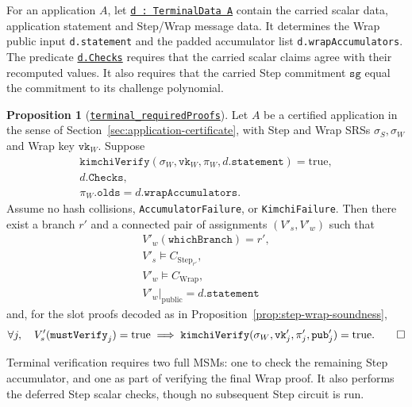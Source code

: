 \documentclass[11pt,a4paper]{article}
\newcommand{\inlinecode}[1]{\mbox{\texttt{#1}}}
\newcommand{\restrict}[2]{\left.#1\right\rvert_{#2}}
\theoremstyle{definition}
\theoremstyle{insetstatement}
\newtheorem{propositiontext}[example]{Proposition}
\newenvironment{statementblock}
  {\begin{list}{}{%
    \setlength{\leftmargin}{0pt}%
    \setlength{\rightmargin}{0pt}%
    \setlength{\labelwidth}{0pt}%
    \setlength{\labelsep}{0pt}%
    \setlength{\itemindent}{0pt}%
    \setlength{\listparindent}{0pt}%
    \setlength{\topsep}{.7\baselineskip plus 2pt minus 1pt}%
    \setlength{\partopsep}{0pt}%
    \setlength{\parsep}{0pt}%
    \setlength{\itemsep}{0pt}}%
    \item\relax}
  {\end{list}}
\newenvironment{proposition}[1][]
  {\begin{statementblock}\begin{propositiontext}[{#1}]\pushQED{\qed}}
  {\popQED\end{propositiontext}\end{statementblock}}
\begin{document}
For an application $A$, let \href{https://github.com/l-adic/snarky/blob/main/formal/pickles/Pickles/Application/Terminal.lean\#L360}{\inlinecode{d : TerminalData A}} contain the carried scalar data,
application statement and Step/Wrap message data. It determines the Wrap
public input \inlinecode{d.statement} and the padded accumulator list
\inlinecode{d.wrapAccumulators}. The predicate
\href{https://github.com/l-adic/snarky/blob/main/formal/pickles/Pickles/Application/Terminal.lean\#L471}{\inlinecode{d.Checks}}
requires that the carried scalar claims agree with their recomputed values.
It also requires that the carried Step commitment $\mathtt{sg}$ equal
the commitment to its challenge polynomial.

\begin{proposition}[\href{https://github.com/l-adic/snarky/blob/main/formal/pickles/Pickles/Application/Terminal.lean\#L918}{\inlinecode{terminal\_requiredProofs}}]
\label{prop:terminal-verification}
Let $A$ be a certified application in the sense of
Section~\ref{sec:application-certificate}, with Step and Wrap SRSs
$\sigma_S,\sigma_W$ and Wrap key $\mathtt{vk}_W$. Suppose
\[
  \begin{gathered}
    \mathtt{kimchiVerify}(\sigma_W,\mathtt{vk}_W,\pi_W,d.\mathtt{statement})
      =\mathrm{true},\\
    d.\mathtt{Checks},\\
    \pi_W.\mathtt{olds}=d.\mathtt{wrapAccumulators}.
  \end{gathered}
\]
Assume no hash collisions, \inlinecode{AccumulatorFailure}, or
\inlinecode{KimchiFailure}. Then there exist a branch $r'$ and a connected pair of assignments
$(V'_s,V'_w)$ such that
\[
  \begin{gathered}
    V'_w(\mathtt{whichBranch})=r',\\
    V'_s\models C_{\mathrm{Step}_{r'}},\\
    V'_w\models C_{\mathrm{Wrap}},\\
    \restrict{V'_w}{\mathrm{public}}=d.\mathtt{statement}
  \end{gathered}
\]
and, for the slot proofs decoded as in Proposition~\ref{prop:step-wrap-soundness},
\[
  \forall j,\quad V'_s(\mathtt{mustVerify}_j)=\mathrm{true}
  \;\Longrightarrow\;
  \mathtt{kimchiVerify}(\sigma_W,\mathtt{vk}'_j,\pi'_j,\mathtt{pub}'_j)
    =\mathrm{true}.\qedhere
\]
\end{proposition}

Terminal verification requires two full MSMs: one to check the remaining
Step accumulator, and one as part of verifying the final Wrap proof. It
also performs the deferred Step scalar checks, though no subsequent Step
circuit is run.
\end{document}

